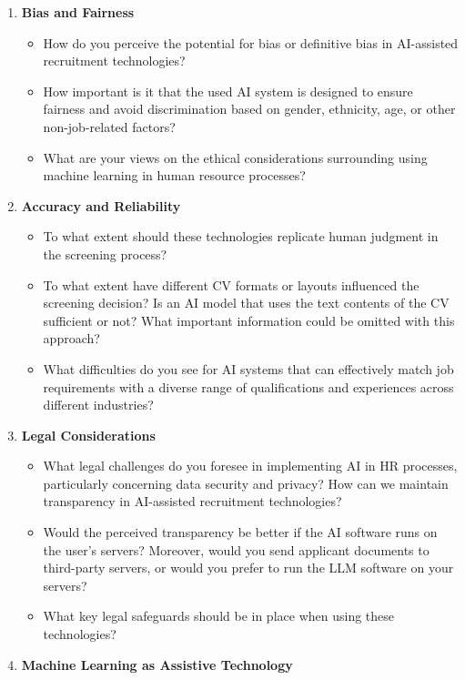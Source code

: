 \documentclass[draft,final]{thesisclass} %
\begin{document}
\begin{enumerate}
    \item \textbf{Bias and Fairness}
    \begin{itemize}
        \item How do you perceive the potential for bias or definitive bias in \acs{AI}-assisted recruitment technologies?
        \item How important is it that the used \acs{AI} system is designed to ensure fairness and avoid discrimination based on gender, ethnicity, age, or other non-job-related factors?
        \item What are your views on the ethical considerations surrounding using machine learning in human resource processes?
    \end{itemize}
    \item \textbf{Accuracy and Reliability}
    \begin{itemize}
        \item To what extent should these technologies replicate human judgment in the screening process?
        \item To what extent have different \acs{CV} formats or layouts influenced the screening decision? Is an \acs{AI} model that uses the text contents of the \acs{CV} sufficient or not? What important information could be omitted with this approach?
        \item What difficulties do you see for \acs{AI} systems that can effectively match job requirements with a diverse range of qualifications and experiences across different industries?
    \end{itemize}
    \item \textbf{Legal Considerations}
    \begin{itemize}
        \item What legal challenges do you foresee in implementing \acs{AI} in \acs{HR} processes, particularly concerning data security and privacy? How can we maintain transparency in \acs{AI}-assisted recruitment technologies?
        \item Would the perceived transparency be better if the \acs{AI} software runs on the user's servers? Moreover, would you send applicant documents to third-party servers, or would you prefer to run the \gls{LLM} software on your servers?
        \item What key legal safeguards should be in place when using these technologies?
    \end{itemize}
    \item \textbf{Machine Learning as Assistive Technology}

\end{enumerate}
\end{document}

